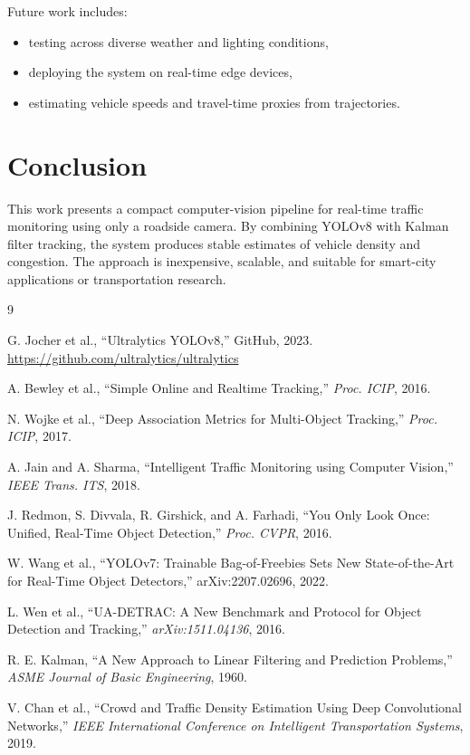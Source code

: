 \documentclass[12pt]{article}
\begin{document}
Future work includes:
\begin{itemize}
    \item testing across diverse weather and lighting conditions,
    \item deploying the system on real-time edge devices,
    \item estimating vehicle speeds and travel-time proxies from trajectories.
\end{itemize}

\section{Conclusion}
This work presents a compact computer-vision pipeline for real-time traffic monitoring using only a roadside camera. By combining YOLOv8 with Kalman filter tracking, the system produces stable estimates of vehicle density and congestion. The approach is inexpensive, scalable, and suitable for smart-city applications or transportation research.

\begin{thebibliography}{9}

G. Jocher et al., ``Ultralytics YOLOv8,'' GitHub, 2023. \url{https://github.com/ultralytics/ultralytics}

A. Bewley et al., ``Simple Online and Realtime Tracking,'' \textit{Proc. ICIP}, 2016.

N. Wojke et al., ``Deep Association Metrics for Multi-Object Tracking,'' \textit{Proc. ICIP}, 2017.

A. Jain and A. Sharma, ``Intelligent Traffic Monitoring using Computer Vision,'' \textit{IEEE Trans. ITS}, 2018.


J. Redmon, S. Divvala, R. Girshick, and A. Farhadi, 
``You Only Look Once: Unified, Real-Time Object Detection,'' 
\textit{Proc. CVPR}, 2016.

W. Wang et al., 
``YOLOv7: Trainable Bag-of-Freebies Sets New State-of-the-Art for Real-Time Object Detectors,'' 
arXiv:2207.02696, 2022.

L. Wen et al., 
``UA-DETRAC: A New Benchmark and Protocol for Object Detection and Tracking,'' 
\textit{arXiv:1511.04136}, 2016.

R. E. Kalman, 
``A New Approach to Linear Filtering and Prediction Problems,'' 
\textit{ASME Journal of Basic Engineering}, 1960.

V. Chan et al., 
``Crowd and Traffic Density Estimation Using Deep Convolutional Networks,'' 
\textit{IEEE International Conference on Intelligent Transportation Systems}, 2019.

\end{thebibliography}
\end{document}
